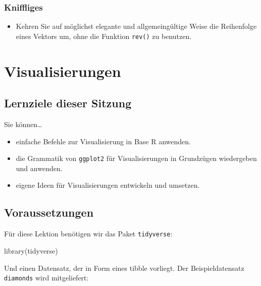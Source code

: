 \documentclass[11pt,german,a4paper]{article}
\newenvironment{Shaded}{\begin{snugshade}}{\end{snugshade}}
\newcommand{\FunctionTok}[1]{\textcolor[rgb]{0.00,0.00,0.00}{#1}}
\newcommand{\NormalTok}[1]{#1}
\providecommand{\tightlist}{%
  \setlength{\itemsep}{0pt}\setlength{\parskip}{0pt}}
\begin{document}
\hypertarget{kniffliges-1}{%
\subsubsection{Kniffliges}\label{kniffliges-1}}

\begin{itemize}
\tightlist
\item
  Kehren Sie auf möglichst elegante und allgemeingültige Weise die Reihenfolge eines Vektors um, ohne die Funktion \texttt{rev()} zu benutzen.
\end{itemize}

\hypertarget{visualisierungen}{%
\section{Visualisierungen}\label{visualisierungen}}

\hypertarget{lernziele-dieser-sitzung-1}{%
\subsection{Lernziele dieser Sitzung}\label{lernziele-dieser-sitzung-1}}

Sie können\ldots{}

\begin{itemize}
\tightlist
\item
  einfache Befehle zur Visualisierung in Base R anwenden.
\item
  die Grammatik von \texttt{ggplot2} für Visualisierungen in Grundzügen wiedergeben und anwenden.
\item
  eigene Ideen für Visualisierungen entwickeln und umsetzen.
\end{itemize}

\hypertarget{voraussetzungen}{%
\subsection{Voraussetzungen}\label{voraussetzungen}}

Für diese Lektion benötigen wir das Paket \texttt{tidyverse}:

\begin{Shaded}
\begin{Highlighting}[]
\FunctionTok{library}\NormalTok{(tidyverse)}
\end{Highlighting}
\end{Shaded}

Und einen Datensatz, der in Form eines tibble vorliegt. Der Beispieldatensatz \texttt{diamonds} wird mitgeliefert:
\end{document}
